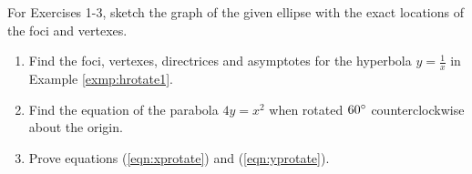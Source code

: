 {\small
{}
\par\noindent For Exercises 1-3, sketch the graph of the given ellipse with
the exact locations of the foci and vertexes.
\begin{enumerate}[\bfseries 1.]
\par\noindent For Exercises 4-7, sketch the graph of the given parabola with
the exact locations of the focus, vertex and directrix.
[{[\bfseries 1.]}]
\par\noindent For Exercises 8-10, sketch the graph of the given hyperbola with
the exact locations of the foci, vertexes, directrices, and asymptotes.
[{[\bfseries 1.]}]
 \item Find the foci, vertexes, directrices and asymptotes for the
  hyperbola $y=\frac{1}{x}$ in Example \ref{exmp:hrotate1}.
 \item Find the equation of the parabola $4y=x^2$ when rotated $60^\circ$
  counterclockwise about the origin.
 \item Prove equations (\ref{eqn:xprotate}) and (\ref{eqn:yprotate}).

\end{enumerate}}
